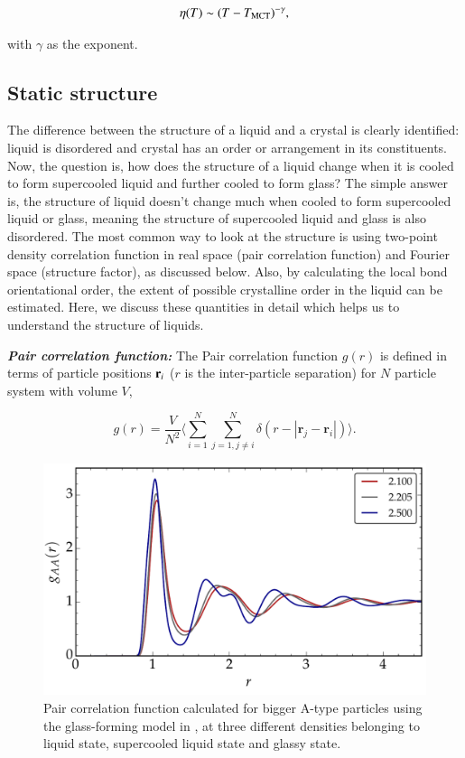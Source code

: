     \begin{equation}
        \eta(T) \sim (T-T_{\rm MCT})^{-\gamma},
    \end{equation}
    
with $\gamma$ as the exponent.

    \subsection{Static structure}\label{structure}
    The difference between the structure of a liquid and a crystal is clearly identified: liquid is disordered and crystal has an order or arrangement in its constituents. Now, the question is, how does the structure of a liquid change when it is cooled to form supercooled liquid and further cooled to form glass? The simple answer is, the structure of liquid doesn't change much when cooled to form supercooled liquid or glass, meaning the structure of supercooled liquid and glass is also disordered. The most common way to look at the structure is using two-point density correlation function in real space (pair correlation function) and Fourier space (structure factor), as discussed below. Also, by calculating the local bond orientational order, the extent of possible crystalline order in the liquid can be estimated. Here, we discuss these quantities in detail which helps us to understand the structure of liquids.
    
    {\bf \em Pair correlation function:} The Pair correlation function $g(r)$ is defined in terms of particle positions ${\bf r}_i$ ($r$ is the inter-particle separation) for $N$ particle system with volume $V$,
    
    \begin{equation}
        g(r)=\frac{V}{N^2} \langle \sum_{i=1}^N \sum_{j=1,j\neq i}^N \delta(r-|\textbf{r}_j-\textbf{r}_i|)\rangle.
    \end{equation}
    
    \begin{figure}[hbt!]
	    \includegraphics[width=14cm]{figs/fig_rdfAA.pdf}
	    \centering
	    \caption[{\em Pair correlation function}]{Pair correlation function calculated for bigger A-type particles using the glass-forming model in \cite{vaibhav2022finite}, at three different densities belonging to liquid state, supercooled liquid state and glassy state.\label{fig_rdf}}
    \end{figure}
    
